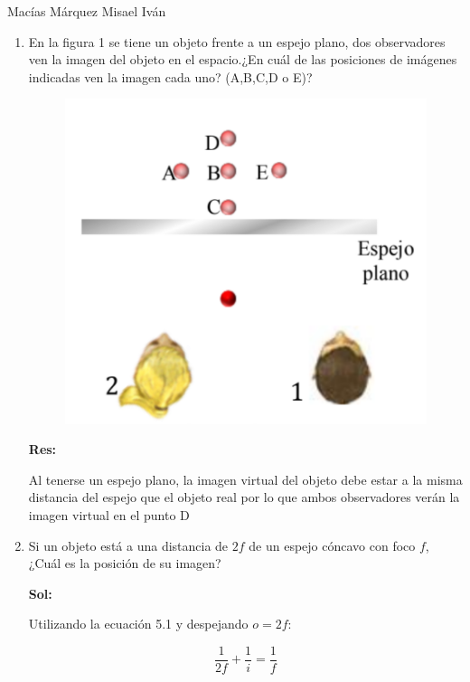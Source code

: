 \documentclass[12pt,a4paper]{article}
\begin{document}
Macías Márquez Misael Iván

\begin{enumerate}






\item En la figura 1 se tiene un objeto frente a un espejo plano, dos observadores ven la imagen del objeto en el espacio.¿En cuál de las posiciones de imágenes indicadas ven la imagen cada uno? (A,B,C,D o E)?

\begin{figure}[h!]
    \centering
    \includegraphics[scale=0.5]{1.PNG}
\end{figure}

\textbf{Res:}

Al tenerse un espejo plano, la imagen virtual del objeto debe estar a la misma distancia del espejo que el objeto real por lo que ambos observadores verán la imagen virtual en el punto D







\item Si un objeto está a una distancia de $2f$ de un espejo cóncavo con foco $f$, ¿Cuál es la posición de su imagen?

\textbf{Sol:}

Utilizando la ecuación 5.1 y despejando $o = 2f$:

\begin{equation*}
    \frac{1}{2f} + \frac{1}{i} = \frac{1}{f}
\end{equation*}


\end{enumerate}
\end{document}
